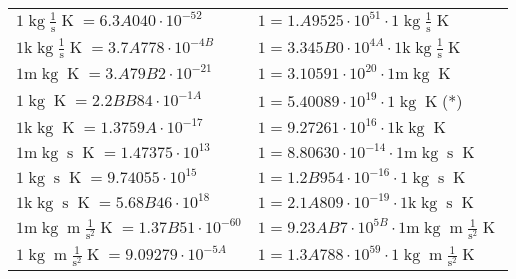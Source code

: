 \begin{center}
\begin{longtable}{l l}
{\color{black}$1 \bm{\mathrm{ }}\operatorname{kg}{}\frac1{\operatorname{s}}{}{\operatorname{K}} = 6.3A040\cdot10^{-52} $}   & {\color{black}$ 1 = 1.A9525\cdot10^{51} \cdot 1 \bm{\mathrm{ }}\operatorname{kg}{}\frac1{\operatorname{s}}{}{\operatorname{K}}$}  \\
{\color{gray}$1 \bm{\mathrm{ k}}\operatorname{kg}{}\frac1{\operatorname{s}}{}{\operatorname{K}} = 3.7A778\cdot10^{-4B} $}   & {\color{gray}$ 1 = 3.345B0\cdot10^{4A} \cdot 1 \bm{\mathrm{ k}}\operatorname{kg}{}\frac1{\operatorname{s}}{}{\operatorname{K}}$}  \\
{\color{gray}$1 \bm{\mathrm{ m}}\operatorname{kg}{}{}{}{\operatorname{K}} = 3.A79B2\cdot10^{-21} $}   & {\color{gray}$ 1 = 3.10591\cdot10^{20} \cdot 1 \bm{\mathrm{ m}}\operatorname{kg}{}{}{}{\operatorname{K}}$}  \\
{\color{black}$1 \bm{\mathrm{ }}\operatorname{kg}{}{}{}{\operatorname{K}} = 2.2BB84\cdot10^{-1A} $}   & {\color{black}$ 1 = 5.40089\cdot10^{19} \cdot 1 \bm{\mathrm{ }}\operatorname{kg}{}{}{}{\operatorname{K}}$}\quad(*)\\
{\color{gray}$1 \bm{\mathrm{ k}}\operatorname{kg}{}{}{}{\operatorname{K}} = 1.3759A\cdot10^{-17} $}   & {\color{gray}$ 1 = 9.27261\cdot10^{16} \cdot 1 \bm{\mathrm{ k}}\operatorname{kg}{}{}{}{\operatorname{K}}$}  \\
{\color{gray}$1 \bm{\mathrm{ m}}\operatorname{kg}{}{\operatorname{s}}{}{\operatorname{K}} = 1.47375\cdot10^{13} $}   & {\color{gray}$ 1 = 8.80630\cdot10^{-14} \cdot 1 \bm{\mathrm{ m}}\operatorname{kg}{}{\operatorname{s}}{}{\operatorname{K}}$}  \\
{\color{black}$1 \bm{\mathrm{ }}\operatorname{kg}{}{\operatorname{s}}{}{\operatorname{K}} = 9.74055\cdot10^{15} $}   & {\color{black}$ 1 = 1.2B954\cdot10^{-16} \cdot 1 \bm{\mathrm{ }}\operatorname{kg}{}{\operatorname{s}}{}{\operatorname{K}}$}  \\
{\color{gray}$1 \bm{\mathrm{ k}}\operatorname{kg}{}{\operatorname{s}}{}{\operatorname{K}} = 5.68B46\cdot10^{18} $}   & {\color{gray}$ 1 = 2.1A809\cdot10^{-19} \cdot 1 \bm{\mathrm{ k}}\operatorname{kg}{}{\operatorname{s}}{}{\operatorname{K}}$}  \\
{\color{gray}$1 \bm{\mathrm{ m}}\operatorname{kg}{\operatorname{m}}\frac1{\operatorname{s}^2}{}{\operatorname{K}} = 1.37B51\cdot10^{-60} $}   & {\color{gray}$ 1 = 9.23AB7\cdot10^{5B} \cdot 1 \bm{\mathrm{ m}}\operatorname{kg}{\operatorname{m}}\frac1{\operatorname{s}^2}{}{\operatorname{K}}$}  \\
{\color{black}$1 \bm{\mathrm{ }}\operatorname{kg}{\operatorname{m}}\frac1{\operatorname{s}^2}{}{\operatorname{K}} = 9.09279\cdot10^{-5A} $}   & {\color{black}$ 1 = 1.3A788\cdot10^{59} \cdot 1 \bm{\mathrm{ }}\operatorname{kg}{\operatorname{m}}\frac1{\operatorname{s}^2}{}{\operatorname{K}}$}  \\

\end{longtable}
\end{center}
